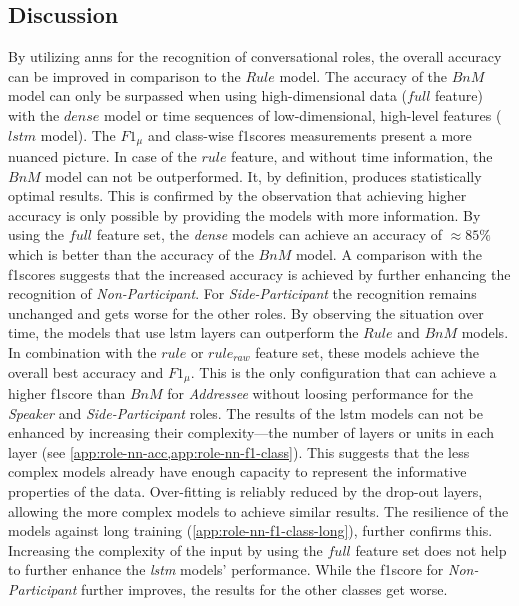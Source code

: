 \subsection{Discussion}

By utilizing \glspl{ann} for the recognition of \glspl{conversational role}, the overall \gls{accuracy} can be improved in comparison to the \(Rule\) model.
The \gls{accuracy} of the \(BnM\) model can only be surpassed when using high-dimensional data (\(full\) feature) with the \(dense\) model or time sequences of low-dimensional, high-level features (\(lstm\) model).
The \(F1_\mu\) and class-wise \glspl{f1score} measurements present a more nuanced picture.
%
In case of the \(rule\) feature, and without time information, the \(BnM\) model can not be outperformed.
It, by definition, produces statistically optimal results.
This is confirmed by the observation that achieving higher \gls{accuracy} is only possible by providing the models with more information.
By using the \(full\) feature set, the \emph{dense} models can achieve an \gls{accuracy} of \(\approx 85\%\) which is better than the \gls{accuracy} of the \(BnM\) model.
A comparison with the \glspl{f1score} suggests that the increased \gls{accuracy} is achieved by further enhancing the recognition of \emph{Non-Participant}.
For \emph{Side-Participant} the recognition remains unchanged and gets worse for the other roles.
By observing the situation over time, the models that use \gls{lstm} layers can outperform the \(Rule\) and \(BnM\) models.
In combination with the \(rule\) or \(rule_{raw}\) feature set, these models achieve the overall best \gls{accuracy} and \(F1_\mu\).
This is the only configuration that can achieve a higher \gls{f1score} than \(BnM\) for \emph{Addressee} without loosing performance for the \emph{Speaker} and \emph{Side-Participant} roles.
The results of the \gls{lstm} models can not be enhanced by increasing their complexity---the number of layers or units in each layer (see \cref{app:role-nn-acc,app:role-nn-f1-class}).
This suggests that the less complex models already have enough capacity to represent the informative properties of the data.
Over-fitting is reliably reduced by the drop-out layers, allowing the more complex models to achieve similar results.
The resilience of the models against long training (\cref{app:role-nn-f1-class-long}), further confirms this. 
Increasing the complexity of the input by using the \(full\) feature set does not help to further enhance the \emph{lstm} models' performance.
While the \gls{f1score} for \emph{Non-Participant} further improves, the results for the other classes get worse.
